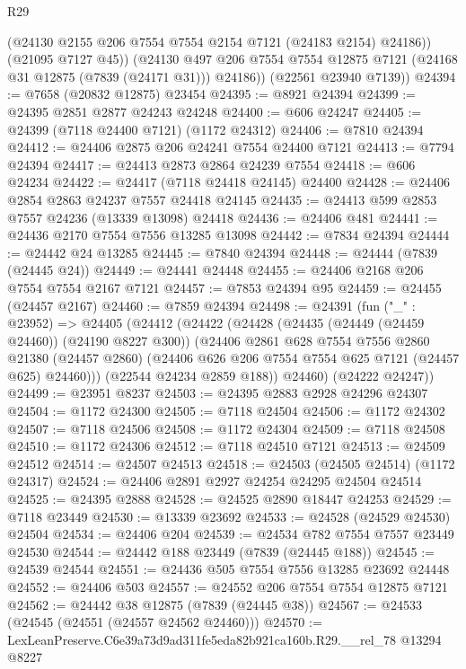 \begin{lexlean}{R29}
\begin{coremodule}
            (@24130 @2155 @206 @7554 @7554 @2154 @7121 (@24183 @2154) @24186))
          (@21095 @7127 @45))
        (@24130 @497 @206 @7554 @7554 @12875 @7121 (@24168 @31 @12875 (@7839 (@24171 @31))) @24186))
      (@22561 @23940 @7139))
@24394 := @7658 (@20832 @12875) @23454
@24395 := @8921 @24394
@24399 := @24395 @2851 @2877 @24243 @24248
@24400 := @606 @24247
@24405 := @24399 (@7118 @24400 @7121) (@1172 @24312)
@24406 := @7810 @24394
@24412 := @24406 @2875 @206 @24241 @7554 @24400 @7121
@24413 := @7794 @24394
@24417 := @24413 @2873 @2864 @24239 @7554
@24418 := @606 @24234
@24422 := @24417 (@7118 @24418 @24145) @24400
@24428 := @24406 @2854 @2863 @24237 @7557 @24418 @24145
@24435 := @24413 @599 @2853 @7557 @24236 (@13339 @13098) @24418
@24436 := @24406 @481
@24441 := @24436 @2170 @7554 @7556 @13285 @13098
@24442 := @7834 @24394
@24444 := @24442 @24 @13285
@24445 := @7840 @24394
@24448 := @24444 (@7839 (@24445 @24))
@24449 := @24441 @24448
@24455 := @24406 @2168 @206 @7554 @7554 @2167 @7121
@24457 := @7853 @24394 @95
@24459 := @24455 (@24457 @2167)
@24460 := @7859 @24394
@24498 := @24391
    (fun ("_" : @23952) =>
    @24405
      (@24412
        (@24422
          (@24428
            (@24435 (@24449 (@24459 @24460)) (@24190 @8227 @300))
            (@24406
              @2861
              @628
              @7554
              @7556
              @2860
              @21380
              (@24457 @2860)
              (@24406 @626 @206 @7554 @7554 @625 @7121 (@24457 @625) @24460)))
          (@22544 @24234 @2859 @188))
        @24460)
      (@24222 @24247))
@24499 := @23951 @8237
@24503 := @24395 @2883 @2928 @24296 @24307
@24504 := @1172 @24300
@24505 := @7118 @24504
@24506 := @1172 @24302
@24507 := @7118 @24506
@24508 := @1172 @24304
@24509 := @7118 @24508
@24510 := @1172 @24306
@24512 := @7118 @24510 @7121
@24513 := @24509 @24512
@24514 := @24507 @24513
@24518 := @24503 (@24505 @24514) (@1172 @24317)
@24524 := @24406 @2891 @2927 @24254 @24295 @24504 @24514
@24525 := @24395 @2888
@24528 := @24525 @2890 @18447 @24253
@24529 := @7118 @23449
@24530 := @13339 @23692
@24533 := @24528 (@24529 @24530) @24504
@24534 := @24406 @204
@24539 := @24534 @782 @7554 @7557 @23449 @24530
@24544 := @24442 @188 @23449 (@7839 (@24445 @188))
@24545 := @24539 @24544
@24551 := @24436 @505 @7554 @7556 @13285 @23692 @24448
@24552 := @24406 @503
@24557 := @24552 @206 @7554 @7554 @12875 @7121
@24562 := @24442 @38 @12875 (@7839 (@24445 @38))
@24567 := @24533 (@24545 (@24551 (@24557 @24562 @24460)))
@24570 := LexLeanPreserve.C6e39a73d9ad311fe5eda82b921ca160b.R29.__rel_78 @13294 @8227

\end{coremodule}
\end{lexlean}
